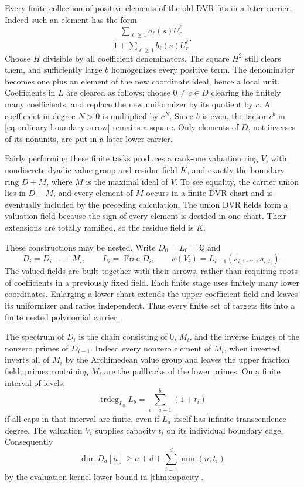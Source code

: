 \documentclass[11pt,reqno]{amsart}
\numberwithin{equation}{section}
\theoremstyle{plain}
\theoremstyle{definition}
\theoremstyle{remark}
\begin{document}
Every finite collection of positive elements of the old DVR fits
in a later carrier. Indeed such an element has the form
\[
 \frac{\sum_{\ell\ge1}a_\ell(s)U_r^\ell}
      {1+\sum_{\ell\ge1}b_\ell(s)U_r^\ell}.
\]
Choose \(H\) divisible by all coefficient denominators. The square
\(H^2\) still clears them, and sufficiently large \(b\) homogenizes
every positive term. The denominator becomes one plus an element
of the new coordinate ideal, hence a local unit. Coefficients in
\(L\) are cleared as follows: choose \(0\ne c\in D\) clearing
the finitely many coefficients, and replace the new uniformizer
by its quotient by \(c\). A coefficient in degree \(N>0\) is
multiplied by \(c^N\). Since \(b\) is even, the factor \(c^b\)
in \eqref{eq:ordinary-boundary-arrow} remains a square.
Only elements of \(D\), not inverses of its nonunits, are put in
a later lower carrier.

Fairly performing these finite tasks produces a rank-one valuation
ring \(V\), with nondiscrete dyadic value group and residue field \(K\),
and exactly the boundary ring \(D+M\), where \(M\) is the maximal
ideal of \(V\). To see equality, the carrier union lies in \(D+M\),
and every element of \(M\) occurs in a finite DVR chart and is
eventually included by the preceding calculation. The union DVR
fields form a valuation field because the sign of every element
is decided in one chart. Their extensions are totally ramified,
so the residue field is \(K\).

These constructions may be nested. Write \(D_0=L_0=\mathbb Q\) and
\begin{equation}\label{eq:ordinary-boundary-tower}
 D_i=D_{i-1}+M_i,\qquad
 L_i=\operatorname{Frac}D_i,\qquad
 \kappa(V_i)=L_{i-1}(s_{i,1},\ldots,s_{i,t_i}).
\end{equation}
The valued fields are built together with their arrows, rather than
requiring roots of coefficients in a previously fixed field.
Each finite stage uses finitely many lower coordinates. Enlarging a
lower chart extends the upper coefficient field and leaves its
uniformizer and ratios independent. Thus every finite set of targets
fits into a finite nested polynomial carrier.

The spectrum of \(D_i\) is the chain consisting of \(0\), \(M_i\),
and the inverse images of the nonzero primes of \(D_{i-1}\).
Indeed every nonzero element of \(M_i\), when inverted, inverts
all of \(M_i\) by the Archimedean value group and leaves the upper
fraction field; primes containing \(M_i\) are the pullbacks of
the lower primes. On a finite interval of levels,
\begin{equation}\label{eq:ordinary-boundary-td}
 \operatorname{trdeg}_{L_a}L_b
       =\sum_{i=a+1}^{b}(1+t_i)
\end{equation}
if all caps in that interval are finite, even if \(L_a\) itself has
infinite transcendence degree. The valuation \(V_i\) supplies
capacity \(t_i\) on its individual boundary edge. Consequently
\begin{equation}\label{eq:ordinary-boundary-lower}
 \dim D_d[n]\ge n+d+\sum_{i=1}^{d}\min(n,t_i)
\end{equation}
by the evaluation-kernel lower bound in \cref{thm:capacity}.
\end{document}
